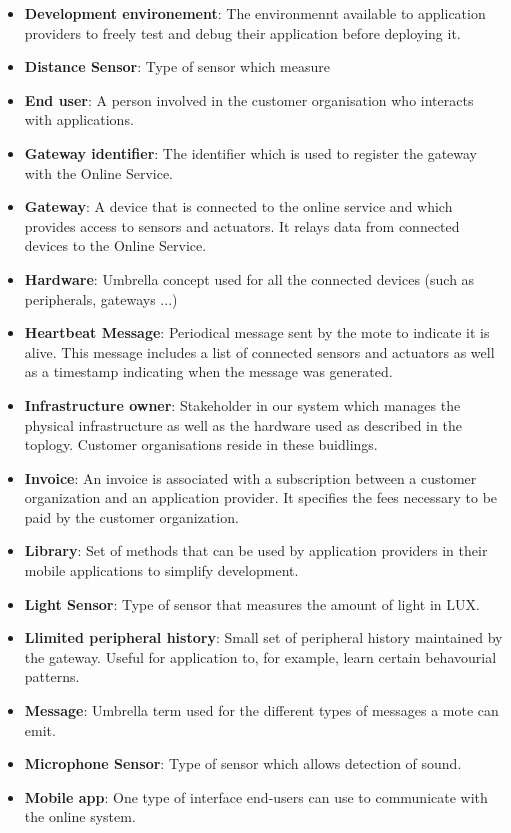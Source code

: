 \documentclass[english]{sareport}
\begin{document}
\begin{itemize}
	\item \textbf{Development environement}: The environmennt available to application providers to freely test and debug their application before deploying it.
	\item \textbf{Distance Sensor}: Type of sensor which measure 
	\item \textbf{End user}: A person involved in the customer organisation who interacts with applications.
	\item \textbf{Gateway identifier}: The identifier which is used to register the gateway with the Online Service.
	\item \textbf{Gateway}: A device that is connected to the online service and which provides access to sensors and actuators. It relays data from connected devices to the Online Service.
	\item \textbf{Hardware}: Umbrella concept used for all the connected devices (such as peripherals, gateways ...)
	\item \textbf{Heartbeat Message}: Periodical message sent by the mote to indicate it is alive. This message includes a list of connected sensors and actuators as well as a timestamp indicating when the message was generated.
	\item \textbf{Infrastructure owner}: Stakeholder in our system which manages the physical infrastructure as well as the hardware used as described in the toplogy. Customer organisations reside in these buidlings.
	\item \textbf{Invoice}: An invoice is associated with a subscription between a customer organization and an application provider. It specifies the fees necessary to be paid by the customer organization.
	\item \textbf{Library}: Set of methods that can be used by application providers in their mobile applications to simplify development.
	\item \textbf{Light Sensor}: Type of sensor that measures the amount of light in LUX.
	\item \textbf{Llimited peripheral history}: Small set of peripheral history maintained by the gateway. Useful for application to, for example, learn certain behavourial patterns.
	\item \textbf{Message}: Umbrella term used for the different types of messages a mote can emit.
	\item \textbf{Microphone Sensor}: Type of sensor which allows detection of sound. 
	\item \textbf{Mobile app}: One type of interface end-users can use to communicate with the online system.

\end{itemize}
\end{document}
